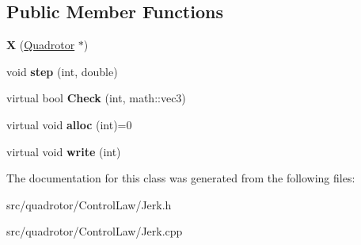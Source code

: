 \subsection*{\-Public \-Member \-Functions}
\begin{DoxyCompactItemize}
\item 
\hypertarget{classJerk_1_1X_a49b3ee051b79b0266fbb0666fc79fcd8}{{\bfseries \-X} (\hyperlink{classQuadrotor}{\-Quadrotor} $\ast$)}\label{classJerk_1_1X_a49b3ee051b79b0266fbb0666fc79fcd8}

\item 
\hypertarget{classJerk_1_1X_a89d9df4dbc31111d148f781d485fa298}{void {\bfseries step} (int, double)}\label{classJerk_1_1X_a89d9df4dbc31111d148f781d485fa298}

\item 
\hypertarget{classJerk_1_1X_a9dd460bb611e2a8dbc989491db8f791c}{virtual bool {\bfseries \-Check} (int, math\-::vec3)}\label{classJerk_1_1X_a9dd460bb611e2a8dbc989491db8f791c}

\item 
\hypertarget{classJerk_1_1X_a4535a7664d3b8180395b8886b7514c92}{virtual void {\bfseries alloc} (int)=0}\label{classJerk_1_1X_a4535a7664d3b8180395b8886b7514c92}

\item 
\hypertarget{classJerk_1_1X_af5bf90eacad593adefea4b552e88b8b0}{virtual void {\bfseries write} (int)}\label{classJerk_1_1X_af5bf90eacad593adefea4b552e88b8b0}

\end{DoxyCompactItemize}


\-The documentation for this class was generated from the following files\-:\begin{DoxyCompactItemize}
\item 
src/quadrotor/\-Control\-Law/\-Jerk.\-h\item 
src/quadrotor/\-Control\-Law/\-Jerk.\-cpp\end{DoxyCompactItemize}

